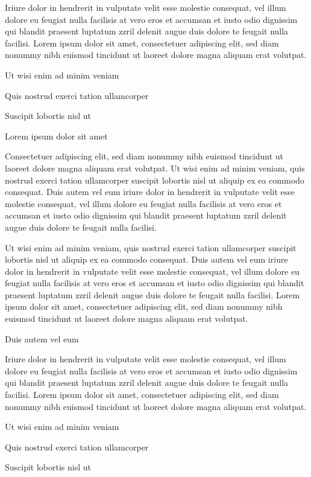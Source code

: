\documentclass[11pt,twoside]{article}\makeatletter
\begin{document}
Iriure dolor in hendrerit in vulputate velit esse molestie consequat, vel illum dolore eu feugiat nulla facilisis at vero eros et accumsan et iusto odio dignissim qui blandit praesent luptatum zzril delenit augue duis dolore te feugait nulla facilisi. Lorem ipsum dolor sit amet, consectetuer adipiscing elit, sed diam nonummy nibh euismod tincidunt ut laoreet dolore magna aliquam erat volutpat. \par
Ut wisi enim ad minim veniam\par
Quis nostrud exerci tation ullamcorper \par
Suscipit lobortis nisl ut \par
Lorem ipsum dolor sit amet\par
Consectetuer adipiscing elit, sed diam nonummy nibh euismod tincidunt ut laoreet dolore magna aliquam erat volutpat. Ut wisi enim ad minim veniam, quis nostrud exerci tation ullamcorper suscipit lobortis nisl ut aliquip ex ea commodo consequat. Duis autem vel eum iriure dolor in hendrerit in vulputate velit esse molestie consequat, vel illum dolore eu feugiat nulla facilisis at vero eros et accumsan et iusto odio dignissim qui blandit praesent luptatum zzril delenit augue duis dolore te feugait nulla facilisi.\par
Ut wisi enim ad minim veniam, quis nostrud exerci tation ullamcorper suscipit lobortis nisl ut aliquip ex ea commodo consequat. Duis autem vel eum iriure dolor in hendrerit in vulputate velit esse molestie consequat, vel illum dolore eu feugiat nulla facilisis at vero eros et accumsan et iusto odio dignissim qui blandit praesent luptatum zzril delenit augue duis dolore te feugait nulla facilisi. Lorem ipsum dolor sit amet, consectetuer adipiscing elit, sed diam nonummy nibh euismod tincidunt ut laoreet dolore magna aliquam erat volutpat. \par
Duis autem vel eum \par
Iriure dolor in hendrerit in vulputate velit esse molestie consequat, vel illum dolore eu feugiat nulla facilisis at vero eros et accumsan et iusto odio dignissim qui blandit praesent luptatum zzril delenit augue duis dolore te feugait nulla facilisi. Lorem ipsum dolor sit amet, consectetuer adipiscing elit, sed diam nonummy nibh euismod tincidunt ut laoreet dolore magna aliquam erat volutpat. \par
Ut wisi enim ad minim veniam\par
Quis nostrud exerci tation ullamcorper \par
Suscipit lobortis nisl ut \par
\end{document}
